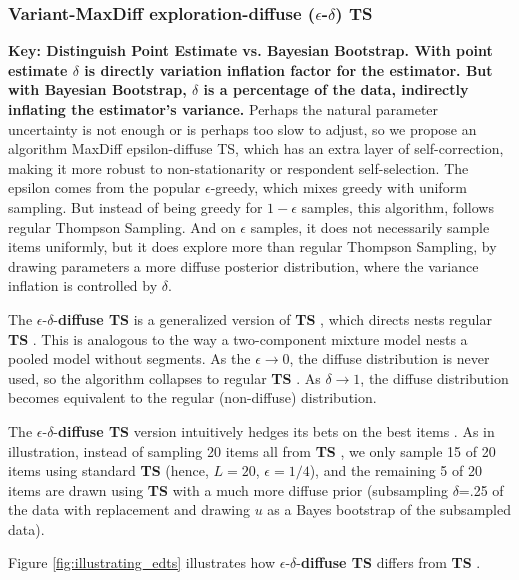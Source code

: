 \documentclass[nonblindrev]{informs3}
\newcommand{\ts}{\textbf{TS} }
\newcommand{\edts}{$\epsilon$-$\delta$-\textbf{diffuse TS} }
\begin{document}
\subsubsection{Variant-MaxDiff exploration-diffuse ($\epsilon$-$\delta$) TS}
\textbf{Key: Distinguish Point Estimate vs. Bayesian Bootstrap. With point estimate $\delta$ is directly variation inflation factor for the estimator. But with Bayesian Bootstrap, $\delta$ is a percentage of the data, indirectly inflating the estimator's variance.}
Perhaps the natural parameter uncertainty is not enough or is perhaps too slow to adjust, so we propose an algorithm MaxDiff epsilon-diffuse TS, which has an extra layer of self-correction, making it more robust to non-stationarity or respondent self-selection. The epsilon comes from the popular $\epsilon$-greedy, which mixes greedy with uniform sampling. But instead of being greedy for $1-\epsilon$ samples, this algorithm, follows regular Thompson Sampling. And on $\epsilon$ samples, it does not necessarily sample items uniformly, but it does explore more than regular Thompson Sampling, by drawing parameters a more diffuse posterior distribution, where the variance inflation is controlled by $\delta$.

The \edts is a generalized version of \ts, which directs nests regular \ts. This is analogous to the way a two-component mixture model nests a pooled model without segments. As the $\epsilon \to 0$, the diffuse distribution is never used, so the algorithm collapses to regular \ts. As $\delta \to 1$, the diffuse distribution becomes equivalent to the regular (non-diffuse) distribution.

The \edts version intuitively hedges its bets on the best items .  As in illustration, instead of sampling 20 items all from \ts, we only sample 15 of 20 items using standard \ts (hence, $L=20$, $\epsilon=1/4$), and the remaining 5 of 20 items are drawn using \ts with a much more diffuse prior (subsampling $\delta$=.25 of the data with replacement and drawing $u$ as a Bayes bootstrap of the subsampled data). 

Figure \ref{fig:illustrating_edts} illustrates how \edts differs from \ts. 
\end{document}
